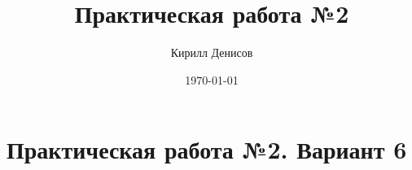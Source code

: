 \documentclass[a4paper,14pt]{extarticle}
\author{Кирилл Денисов}
\title{Практическая работа №2}
\date{\today}
\begin{document}
\thispagestyle{empty}


\newpage
\section{Практическая работа №2. Вариант 6}
\begin{problem}
	
\end{problem}
\end{document}
